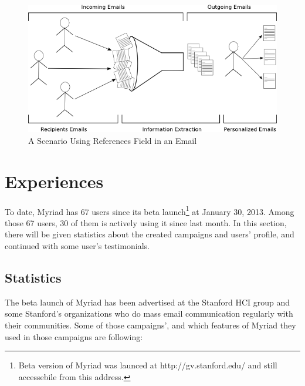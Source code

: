 \begin{figure}[htbp]
	\centering
	\includegraphics[width=1.00\textwidth]{imgs/drawingStatesOfEmailCommunication.png}
	\caption[A Scenario Using References Field in an Email]{A Scenario Using References Field in an Email}
	\label{fig:drawingStatesOfEmailCommunication}
\end{figure}

\section{Experiences}
\label{sec:5.5:Expr}

To date, Myriad has 67 users since its beta launch\footnote{Beta version of Myriad was launced at http://gv.stanford.edu/ and still accessebile from this address.} at January 30, 2013. Among those 67 users, 30 of them is actively using it since last month. In this section, there will be given statistics about the created campaigns and users' profile, and continued with some user's testimonials.

\subsection{Statistics}
\label{subsec:5.4.1:Stat}

The beta launch of Myriad has been advertised at the Stanford \ac{HCI} group and some Stanford's organizations who do mass email communication regularly with their communities. Some of those campaigns', and which features of Myriad they used in those campaigns are following:


